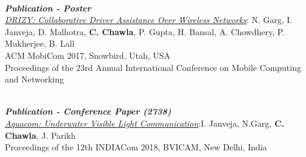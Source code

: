 \documentclass[11pt]{res} %
\newcommand{\titlegap}{5pt} %
\newcommand{\sectgap}{0.05in} %
\begin{document}
\begin{resume}
\\
\textbf{\textit{Publication - Poster}}\\ \textcolor{blue}{\textit{\href{https://dl.acm.org/doi/10.1145/3117811.3131255}{DRIZY: Collaborative Driver Assistance Over Wireless Networks}}}:\hspace{0.3cm} N. Garg, I. Janveja, D. Malhotra, \textbf{C. Chawla}, P. Gupta, H. Bansal, A. Chowdhery, P. Mukherjee, B. Lall\\
ACM MobiCom 2017, Snowbird, Utah, USA
\\Proceedings of the 23rd Annual International Conference on Mobile Computing and Networking

\\
\textbf{\textit{Publication - Conference Paper (2738)}}\\ \textcolor{blue}{\textit{\href{http://bvicam.in/INDIACom/news/INDIACom\%202018\%20Proceedings/Main/papers.html}{Aquacom: Underwater Visible Light Communication}}}:\hfill I. Janveja, N.Garg, \textbf{C. Chawla}, J. Parikh\\
Proceedings of the 12th INDIACom 2018, BVICAM, New Delhi, India

\vspace{0.1in} 
\hline











\end{resume}
\end{document}

